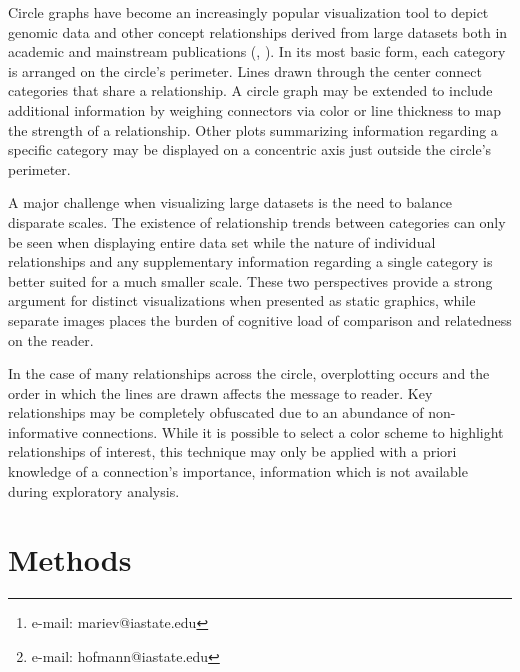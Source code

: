 \documentclass{vgtc}                          %
\title{}
\author{Marie Vendettuoli\thanks{e-mail: mariev@iastate.edu} %
\and Heike Hofmann\thanks{e-mail: hofmann@iastate.edu}\\
\scriptsize Department of Statistics }%
\affiliation{\scriptsize Human Computer Interaction Program \\ Bioinformatics and Computational Biology Program \\ Iowa State University}
\begin{document}


\maketitle

Circle graphs have become an increasingly popular visualization tool to depict genomic data and other concept relationships derived from large datasets both in academic and mainstream publications (\cite{aumann99}, \cite{krzywinski09}). In its most basic form, each category is arranged on the circle’s perimeter. Lines drawn through the center connect categories that share a relationship.  A circle graph may be extended to include additional information by weighing connectors via color or line thickness to map the strength of a relationship. Other plots summarizing information regarding a specific category may be displayed on a concentric axis just outside the circle’s perimeter.

A major challenge when visualizing large datasets is the need to balance disparate scales. The existence of relationship trends between categories can only be seen when displaying entire data set while the nature of individual relationships and any supplementary information regarding a single category is better suited for a much smaller scale. These two perspectives provide a strong argument for distinct visualizations when presented as static graphics, while separate images places the burden of cognitive load of comparison and relatedness on the reader. 

In the case of many relationships across the circle, overplotting occurs and the order in which the lines are drawn affects the message to reader. Key relationships may be completely obfuscated due to an abundance of non-informative connections. While it is possible to select a color scheme to highlight relationships of interest, this technique may only be applied with a priori knowledge of a connection’s importance, information which is not available during exploratory analysis.
\section{Methods}
\end{document}
